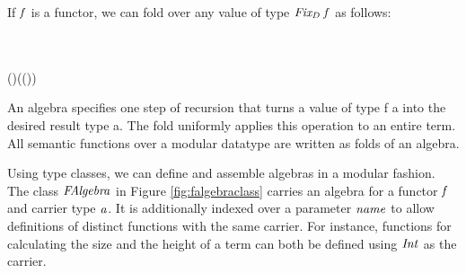 If \ensuremath{\Varid{f}} is a functor, we can fold over any value of type \ensuremath{\Varid{Fix_{D}}\;\Varid{f}} as
follows:
\begin{hscode}\SaveRestoreHook
{}%
%
%
\>[3]{}\;\;\;\mathrel{=}\;\to {}\<[E]%
\\
\>[3]{}\mathbin{::}\;\Rightarrow {}\;\;\to {}\;\to {}\<[E]%
\\
\>[3]{}\;\;(\;)\mathrel{=}\;(\;(\;)\;){}\<[E]%
\ColumnHook
\end{hscode}\resethooks
An algebra specifies one step of recursion that turns a value of type
f a into the desired result type a. The fold uniformly applies this
operation to an entire term. All semantic functions over a modular
datatype are written as folds of an algebra.

Using type classes, we can define and assemble algebras in a modular
fashion. The class \ensuremath{\Conid{FAlgebra}} in Figure \ref{fig:falgebraclass}
carries an algebra for a functor \ensuremath{\Varid{f}} and carrier type \ensuremath{\Varid{a}}. It is
additionally indexed over a parameter \ensuremath{\Varid{name}} to allow definitions of
distinct functions with the same carrier. For instance, functions for
calculating the size and the height of a term can both be defined
using \ensuremath{\Conid{Int}} as the carrier.

